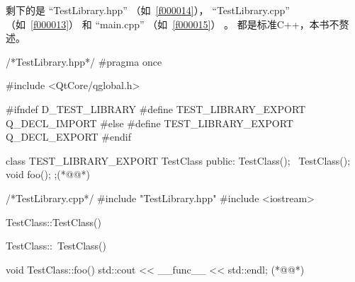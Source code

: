 剩下的是
“TestLibrary.hpp”
（如\filesourcenumbernameone\ \ref{f000014}），
“TestLibrary.cpp”
（如\filesourcenumbernameone\ \ref{f000013}）
和
“main.cpp”
（如\filesourcenumbernameone\ \ref{f000015}）
。
都是标准C{\sourcefonttwo{}+}{\sourcefonttwo{}+}，本书不赘述。
\label{f000014}    %
\FloatBarrier                                  %
\begin{thebookfilesourceone}[escapeinside={(*@}{@*)},
caption=GoodLuck,
title=\filesourcenumbernameone \thefilesourcenumber
]
/*TestLibrary.hpp*/
#pragma once

#include <QtCore/qglobal.h>

#ifndef D_TEST_LIBRARY
#define TEST_LIBRARY_EXPORT Q_DECL_IMPORT
#else
#define TEST_LIBRARY_EXPORT Q_DECL_EXPORT
#endif

class TEST_LIBRARY_EXPORT TestClass {
public:
    TestClass();
    ~TestClass();
    void foo();
};(*@\marginpar[\hfill\setlength\fboxsep{2pt}\fbox{\footnotesize{\kaishu\parbox{1em}{\setlength{\baselineskip}{2pt}\filesourcenumbernameone}}\footnotesize{\thefilesourcenumber}}]{\setlength\fboxsep{2pt}\fbox{\footnotesize{\kaishu\parbox{1em}{\setlength{\baselineskip}{2pt}\filesourcenumbernameone}}\footnotesize{\thefilesourcenumber}}}@*)\end{thebookfilesourceone}          %
\addtocounter{lstlisting}{-1}   %
\label{f000013}    %
\FloatBarrier                                  %
\begin{thebookfilesourceone}[escapeinside={(*@}{@*)},
caption=GoodLuck,
title=\filesourcenumbernameone \thefilesourcenumber
]
/*TestLibrary.cpp*/
#include "TestLibrary.hpp"
#include <iostream>

TestClass::TestClass() {
}

TestClass::~TestClass() {
}

void TestClass::foo() {
    std::cout << __func__ << std::endl;
}(*@\marginpar[\hfill\setlength\fboxsep{2pt}\fbox{\footnotesize{\kaishu\parbox{1em}{\setlength{\baselineskip}{2pt}\filesourcenumbernameone}}\footnotesize{\thefilesourcenumber}}]{\setlength\fboxsep{2pt}\fbox{\footnotesize{\kaishu\parbox{1em}{\setlength{\baselineskip}{2pt}\filesourcenumbernameone}}\footnotesize{\thefilesourcenumber}}}@*)\end{thebookfilesourceone}          %
